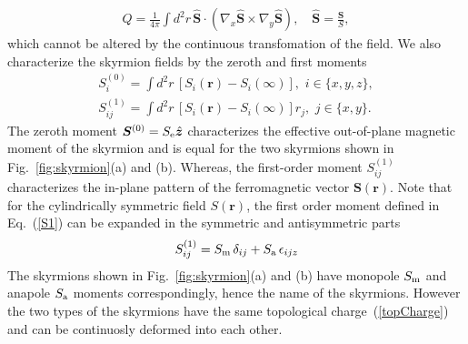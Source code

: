 \documentclass[twocolumn,showpacs,floatfix,nofootinbib,longbibliography]{revtex4-1}
\begin{document}
\begin{align}
	Q = \frac{1}{4\pi} \int d^2r \, \hat {\bm S}\cdot (\nabla_x\hat {\bm S}\times\nabla_y\hat {\bm S}), \quad \hat {\bm S}= \frac{\bm S}{S},
	\label{topCharge}
\end{align}
which cannot be altered by the continuous transfomation of the field.  We also characterize the skyrmion fields by the zeroth and first moments
\begin{align}
	S^{(0)}_i = \int  d^2r \, \left[S_i(\bm r)-S_i(\infty)\right],\,\, i\in \{x,y,z\}, \label{S0} \\
	S^{(1)}_{ij} = \int  d^2r \, \left[S_i(\bm r)-S_i(\infty)\right] r_j,\,\, j\in \{x,y\}. \label{S1}
\end{align}
The zeroth moment $\bm S^{(0)} = S_{\rm e} \hat{\bm z}$ characterizes the effective out-of-plane magnetic moment of the skyrmion and is equal for the two skyrmions shown in Fig.~{\ref{fig:skyrmion}}(a) and (b). Whereas, the first-order moment $S^{(1)}_{ij}$ characterizes the in-plane pattern of the ferromagnetic vector $\bm S(\bm r)$. Note that for the cylindrically symmetric field $S(\bm r)$, the first order moment defined in Eq.~(\ref{S1}) can be expanded in the symmetric and antisymmetric parts
\begin{equation}
	S^{(1)}_{ij}=S_{\rm m}\,\delta_{ij} + S_{\rm a}\,\epsilon_{ijz}
\end{equation}
The skyrmions shown in Fig.~\ref{fig:skyrmion}(a) and (b) have monopole $S_{\rm m}$ and anapole $S_{\rm a}$ moments correspondingly, hence the name of the skyrmions. However the two types of the skyrmions have the same topological charge~(\ref{topCharge}) and can be continuosly deformed into each other.
\end{document}
